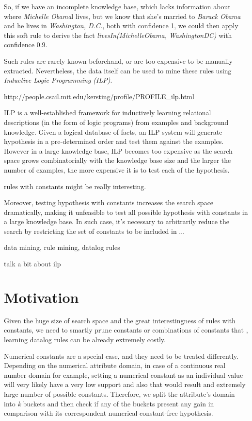 So, if we have an incomplete knowledge base, which lacks information about where \emph{Michelle Obama}l lives, but we know that she's married to \emph{Barack Obama} and he lives in \emph{Washington, D.C.}, both with confidence 1, we could then apply this soft rule to derive the fact \emph{livesIn(MichelleObama, WashingtonDC)} with confidence 0.9.

Such rules are rarely known beforehand, or are too expensive to be manually extracted. Nevertheless, the data itself can be used to mine these rules using \emph{Inductive Logic Programming (ILP)}. 

http://people.csail.mit.edu/kersting/profile/PROFILE_ilp.html

ILP is a well-established framework for inductively learning relational descriptions (in the form of logic programs) from examples and background knowledge. Given a logical database of facts, an ILP system will generate hypothesis in a pre-determined order and test them against the examples. However in a large knowledge base, ILP becomes too expensive as the search space grows combinatorially with the knowledge base size and the larger the number of examples, the more expensive it is to test each of the hypothesis.

rules with constants might be really interesting.


Moreover, testing hypothesis with constants increases the search space dramatically, making it unfeasible to test all possible hypothesis with constants in a large knowledge base. In such case, it's necessary to arbitrarily reduce the search by restricting the set of constants to be included in ...

data mining, rule mining, datalog rules



talk a bit about ilp

\section{Motivation}
Given the huge size of search space and the great interestingness of rules with constants, we need to smartly prune constants or combinations of constants that  , learning datalog rules can be already extremely costly.

Numerical constants are a special case, and they need to be treated differently. Depending on the numerical attribute domain, in case of a continuous real number domain for example, setting a numerical constant as an individual value will very likely have a very low support and also that would result and extremely large number of possible constants. Therefore, we split the attribute's domain into \emph{k} buckets and then check if any of the buckets present any gain in comparison with its correspondent numerical constant-free hypothesis.

